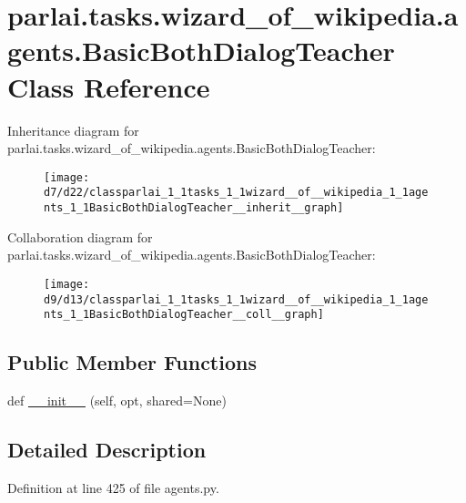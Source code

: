 \hypertarget{classparlai_1_1tasks_1_1wizard__of__wikipedia_1_1agents_1_1BasicBothDialogTeacher}{}\section{parlai.\+tasks.\+wizard\+\_\+of\+\_\+wikipedia.\+agents.\+Basic\+Both\+Dialog\+Teacher Class Reference}
\label{classparlai_1_1tasks_1_1wizard__of__wikipedia_1_1agents_1_1BasicBothDialogTeacher}


Inheritance diagram for parlai.\+tasks.\+wizard\+\_\+of\+\_\+wikipedia.\+agents.\+Basic\+Both\+Dialog\+Teacher\+:
\nopagebreak
\begin{figure}[H]
\begin{center}
\leavevmode
\texttt{[image: d7/d22/classparlai\_1\_1tasks\_1\_1wizard\_\_of\_\_wikipedia\_1\_1agents\_1\_1BasicBothDialogTeacher\_\_inherit\_\_graph]}
\end{center}
\end{figure}


Collaboration diagram for parlai.\+tasks.\+wizard\+\_\+of\+\_\+wikipedia.\+agents.\+Basic\+Both\+Dialog\+Teacher\+:
\nopagebreak
\begin{figure}[H]
\begin{center}
\leavevmode
\texttt{[image: d9/d13/classparlai\_1\_1tasks\_1\_1wizard\_\_of\_\_wikipedia\_1\_1agents\_1\_1BasicBothDialogTeacher\_\_coll\_\_graph]}
\end{center}
\end{figure}
\subsection*{Public Member Functions}
\begin{DoxyCompactItemize}
\item 
def \hyperlink{classparlai_1_1tasks_1_1wizard__of__wikipedia_1_1agents_1_1BasicBothDialogTeacher_a8542415af7170c35c6c5844b28099072}{\+\_\+\+\_\+init\+\_\+\+\_\+} (self, opt, shared=None)
\end{DoxyCompactItemize}


\subsection{Detailed Description}


Definition at line 425 of file agents.\+py.



